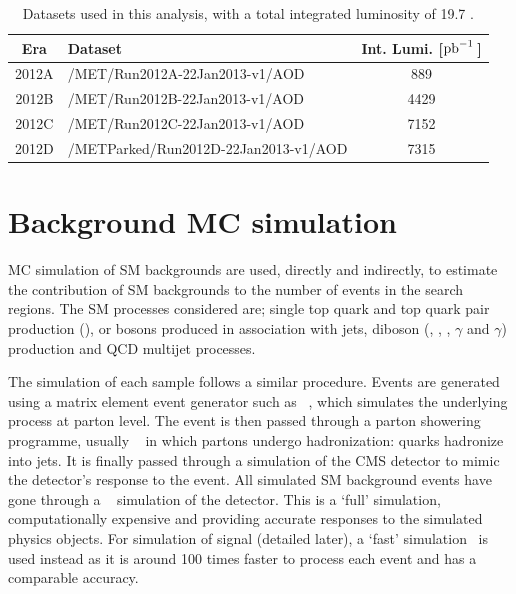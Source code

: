 \begin{table} %
    \begin{center}
    \caption{Datasets used in this analysis, with a total integrated luminosity of 19.7 \fbinv.}
     \begin{tabular}{clc}\hline
Era    &       Dataset  &  Int. Lumi. [$\mathrm{pb}^{-1}\,$]\\ \hline
2012A & /MET/Run2012A-22Jan2013-v1/AOD & 889 \\
2012B & /MET/Run2012B-22Jan2013-v1/AOD & 4429 \\
2012C & /MET/Run2012C-22Jan2013-v1/AOD & 7152 \\
2012D & /METParked/Run2012D-22Jan2013-v1/AOD & 7315 \\ \hline
                \end{tabular}
                    \label{tab:dataSets}
\end{center}
\end{table}




%
\section{Background MC simulation} 
\label{sec:GEN}
\ac{MC} simulation of \ac{SM} backgrounds are used, directly and indirectly, to estimate the contribution of \ac{SM} backgrounds to the number of events in the search regions. 
The \ac{SM} processes considered are; single top quark and top quark pair production (\ttbar), \W or \Z bosons produced in association with jets, diboson (\W\W, \W\Z, \Z\Z, \W$\gamma$ and \Z$\gamma$) production and QCD multijet processes.

The simulation of each sample follows a similar procedure.
Events are generated using a matrix element event generator such as \MADGRAPH{}~\cite{madgraph,madgraph2}, which simulates the underlying process at parton level. 
The event is then passed through a parton showering programme, usually \PYTHIA{}~\cite{pythia,pythia8,pythia-z2} in which partons undergo hadronization: quarks hadronize into jets.
It is finally passed through a simulation of the CMS detector to mimic the detector's response to the event.
All simulated \ac{SM} background events have gone through a \GEANTfour~\cite{Geant4-1,Geant4-2} simulation of the detector. 
This is a `full' simulation, computationally expensive and providing accurate responses to the simulated physics objects.  
For simulation of signal (detailed later), a `fast' simulation~\cite{FASTSIM} is used instead as it is around 100 times faster to process each event and has a comparable accuracy.

